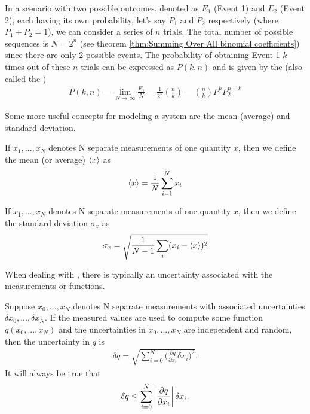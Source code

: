 In a scenario with two possible outcomes, denoted as $E_1$ (Event 1) and $E_2$ (Event 2), each having its own probability, let's say $P_1$ and $P_2$ respectively (where $P_1 + P_2 = 1$), we can consider a series of $n$ trials. The total number of possible sequences is $N=2^n$ (see theorem \ref{thm:Summing Over All binomial coefficients}) since there are only 2 possible events. The probability of obtaining Event 1 $k$ times out of these $n$ trials can be expressed as $P(k, n)$ and is given by the  (also called the )
\begin{align}
P(k,n) = \lim_{N\rightarrow\infty}\frac{E_1}{N} = \frac{1}{2^n}{{n}\choose{k}} = {{n}\choose{k}}P_1^kP_2^{n-k}
\end{align}

Some more useful concepts for modeling a system are the mean (average) and standard deviation. 

\begin{defn}{1}
	If $x_1, ..., x_N$ denotes N separate measurements of one quantity $x$, then we define the mean (or average) $\braket{x}$ as
	\begin{align}
		\braket{x} = \frac{1}{N}\sum_{i=1}^{N}x_i \label{mean equation}
	\end{align}
\end{defn}

\begin{defn}{1}
	If $x_1, ..., x_N$ denotes N separate measurements of one quantity $x$, then we define the standard deviation $\sigma_x$ as
	\begin{align}
		\sigma_x = \sqrt{\frac{1}{N-1}\sum_{i}(x_i-\braket{x})^2}
	\end{align}
\end{defn}

When dealing with , there is typically an uncertainty associated with the measurements or functions.

\begin{defn}{1}
	Suppose $x_0, ..., x_N$ denotes N separate measurements with associated uncertainties $\delta x_0, ..., \delta x_N$. If the measured values are used to compute some function $q(x_0, ..., x_N)$ and the uncertainties in $x_0, ..., x_N$ are independent and random, then the uncertainty in $q$ is
	\begin{align}
		\delta q = \sqrt{\sum_{i=0}^{N}\bigg(\frac{\partial q}{\partial x_i} \delta x_i\bigg)^2}.
	\end{align}
 It will always be true that 
 	\begin{align}
		\delta q \leq \sum_{i=0}^{N}\left| \frac{\partial q}{\partial x_i} \right| \delta x_i.
	\end{align}
\end{defn}

 